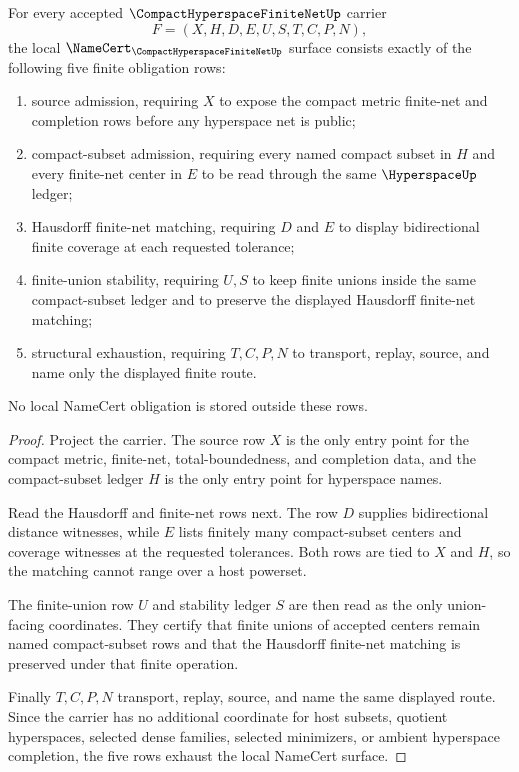 \begin{theorem}
\label{thm:compact-hyperspace-finite-net-namecert-obligations}
For every accepted $\CompactHyperspaceFiniteNetUp$ carrier
$$
F=(X,H,D,E,U,S,T,C,P,N),
$$
the local $\NameCert_{\CompactHyperspaceFiniteNetUp}$ surface consists exactly of the following five finite obligation rows:
\begin{enumerate}
\item source admission, requiring $X$ to expose the compact metric finite-net and completion rows before any hyperspace net is public;
\item compact-subset admission, requiring every named compact subset in $H$ and every finite-net center in $E$ to be read through the same $\HyperspaceUp$ ledger;
\item Hausdorff finite-net matching, requiring $D$ and $E$ to display bidirectional finite coverage at each requested tolerance;
\item finite-union stability, requiring $U,S$ to keep finite unions inside the same compact-subset ledger and to preserve the displayed Hausdorff finite-net matching;
\item structural exhaustion, requiring $T,C,P,N$ to transport, replay, source, and name only the displayed finite route.
\end{enumerate}
No local NameCert obligation is stored outside these rows.
\end{theorem}
\begin{proof}
Project the carrier. The source row $X$ is the only entry point for the compact metric, finite-net, total-boundedness, and completion data, and the compact-subset ledger $H$ is the only entry point for hyperspace names.

Read the Hausdorff and finite-net rows next. The row $D$ supplies bidirectional distance witnesses, while $E$ lists finitely many compact-subset centers and coverage witnesses at the requested tolerances. Both rows are tied to $X$ and $H$, so the matching cannot range over a host powerset.

The finite-union row $U$ and stability ledger $S$ are then read as the only union-facing coordinates. They certify that finite unions of accepted centers remain named compact-subset rows and that the Hausdorff finite-net matching is preserved under that finite operation.

Finally $T,C,P,N$ transport, replay, source, and name the same displayed route. Since the carrier has no additional coordinate for host subsets, quotient hyperspaces, selected dense families, selected minimizers, or ambient hyperspace completion, the five rows exhaust the local NameCert surface.
\end{proof}

